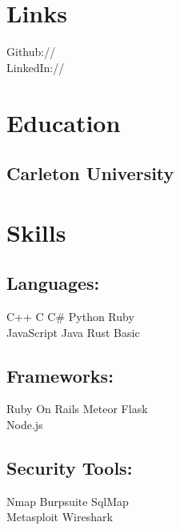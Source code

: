 \documentclass[]{deedy-resume-openfont}
\begin{document}
\vspace{1cm}
%
%
\begin{minipage}[t]{0.33\textwidth} 
\section{Links} 
Github:// \href{https://github.com/angelonfira}{} \\
LinkedIn://  \href{https://www.linkedin.com/in/forest-anderson}{}
\sectionsep
\section{Education} 
\subsection{Carleton University}
\sectionsep
\section{Skills}
\subsection{Languages:}
C++ \textbullet{} C \textbullet{} C\# \textbullet{} Python \textbullet{} Ruby \\
JavaScript \textbullet{} Java \textbullet{} Rust \textbullet{} Basic\\
\sectionsep
\subsection{Frameworks:}
Ruby On Rails \textbullet{} Meteor \textbullet{} Flask \\
Node.js \\
\sectionsep
\subsection{Security Tools:}
Nmap \textbullet{} Burpsuite \textbullet{} SqlMap\\
Metasploit \textbullet{} Wireshark \\
\sectionsep

\end{minipage}
\end{document}
